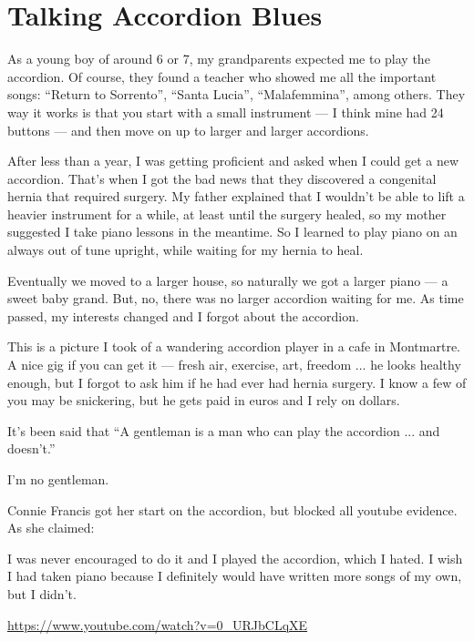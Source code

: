 \section{Talking Accordion Blues}

As a young boy of around 6 or 7, my grandparents expected me to play the accordion. Of course, they found a teacher who showed me all the important songs: ``Return to Sorrento'', ``Santa Lucia'', ``Malafemmina'', among others. They way it works is that you start with a small instrument --- I think mine had 24 buttons --- and then move on up to larger and larger accordions.

After less than a year, I was getting proficient and asked when I could get a new accordion. That's when I got the bad news that they discovered a congenital hernia that required surgery. My father explained that I wouldn't be able to lift a heavier instrument for a while, at least until the surgery healed, so my mother suggested I take piano lessons in the meantime. So I learned to play piano on an always out of tune upright, while waiting for my hernia to heal.

Eventually we moved to a larger house, so naturally we got a larger piano --- a sweet baby grand. But, no, there was no larger accordion waiting for me. As time passed, my interests changed and I forgot about the accordion.

This is a picture I took of a wandering accordion player in a cafe in Montmartre. A nice gig if you can get it --- fresh air, exercise, art, freedom ... he looks healthy enough, but I forgot to ask him if he had ever had hernia surgery. I know a few of you may be snickering, but he gets paid in euros and I rely on dollars.

It's been said that ``A gentleman is a man who can play the accordion ... and doesn't.''

I'm no gentleman.

Connie Francis got her start on the accordion, but blocked all youtube evidence. As she claimed:

\begin{quotex}
I was never encouraged to do it and I played the accordion, which I hated. I wish I had taken piano because I definitely would have written more songs of my own, but I didn't.
\end{quotex} 

\url{https://www.youtube.com/watch?v=0\_URJbCLqXE}


